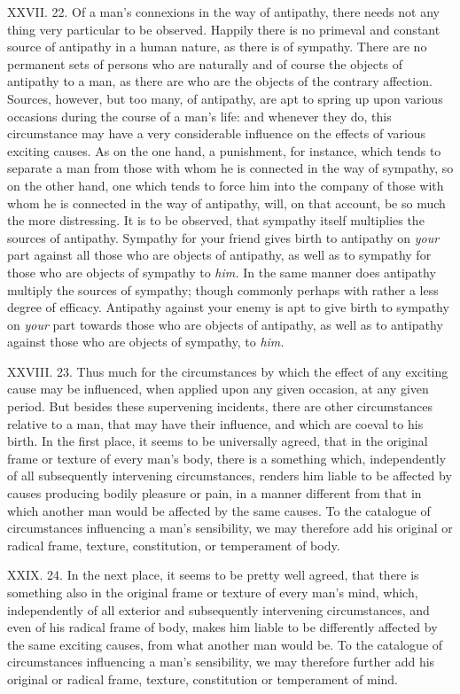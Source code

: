 \documentclass[12pt]{report}
\begin{document}
XXVII. 22. Of a man's connexions in the way of antipathy, there needs
not any thing very particular to be observed. Happily there is no
primeval and constant source of antipathy in a human nature, as there is
of sympathy. There are no permanent sets of persons who are naturally
and of course the objects of antipathy to a man, as there are who are
the objects of the contrary affection. Sources, however, but too many,
of antipathy, are apt to spring up upon various occasions during the
course of a man's life: and whenever they do, this circumstance may have
a very considerable influence on the effects of various exciting causes.
As on the one hand, a punishment, for instance, which tends to separate
a man from those with whom he is connected in the way of sympathy, so on
the other hand, one which tends to force him into the company of those
with whom he is connected in the way of antipathy, will, on that
account, be so much the more distressing. It is to be observed, that
sympathy itself multiplies the sources of antipathy. Sympathy for your
friend gives birth to antipathy on \emph{your} part against all those
who are objects of antipathy, as well as to sympathy for those who are
objects of sympathy to \emph{him.} In the same manner does antipathy
multiply the sources of sympathy; though commonly perhaps with rather a
less degree of efficacy. Antipathy against your enemy is apt to give
birth to sympathy on \emph{your} part towards those who are objects of
antipathy, as well as to antipathy against those who are objects of
sympathy, to \emph{him.}

XXVIII. 23. Thus much for the circumstances by which the effect of any
exciting cause may be influenced, when applied upon any given occasion,
at any given period. But besides these supervening incidents, there are
other circumstances relative to a man, that may have their influence,
and which are coeval to his birth. In the first place, it seems to be
universally agreed, that in the original frame or texture of every man's
body, there is a something which, independently of all subsequently
intervening circumstances, renders him liable to be affected by causes
producing bodily pleasure or pain, in a manner different from that in
which another man would be affected by the same causes. To the catalogue
of circumstances influencing a man's sensibility, we may therefore add
his original or radical frame, texture, constitution, or temperament of
body.

XXIX. 24. In the next place, it seems to be pretty well agreed, that
there is something also in the original frame or texture of every man's
mind, which, independently of all exterior and subsequently intervening
circumstances, and even of his radical frame of body, makes him liable
to be differently affected by the same exciting causes, from what
another man would be. To the catalogue of circumstances influencing a
man's sensibility, we may therefore further add his original or radical
frame, texture, constitution or temperament of mind.
\end{document}
